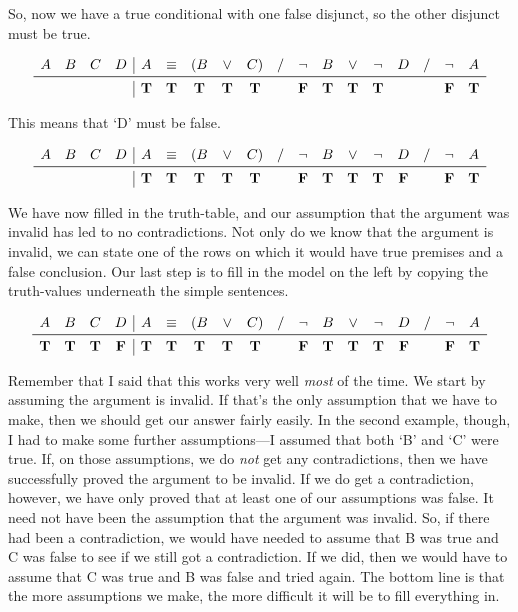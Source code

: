 \documentclass[../logic-text.tex]{subfiles}
\begin{document}
So, now we have a true conditional with one false disjunct, so the other disjunct must be true.


\[
\begin{array}{cccc|cccccccccccccc}
  A&B&C&D& A &  \liff & (B & \lor & C) & / & \lneg & B & \lor & \lneg & D & / & \lneg & A \\ \midrule
  &&&& \true & \true & \true & \true & \true && \false & \true & \true & \true &&& \false & \true \\
  \end{array}
\]

This means that \enquote*{D} must be false.

\[
\begin{array}{cccc|cccccccccccccc}
  A&B&C&D& A &  \liff & (B & \lor & C) & / & \lneg & B & \lor & \lneg & D & / & \lneg & A \\ \midrule
  &&&& \true & \true & \true & \true & \true && \false & \true & \true & \true & \false && \false & \true \\
  \end{array}
\]

We have now filled in the truth-table, and our assumption that the argument was invalid has led to no contradictions. Not only do we know that the argument is invalid, we can state one of the rows on which it would have true premises and a false conclusion. Our last step is to fill in the model on the left by copying the truth-values underneath the simple sentences.


\[
\begin{array}{cccc|cccccccccccccc}
  A&B&C&D& A &  \liff & (B & \lor & C) & / & \lneg & B & \lor & \lneg & D & / & \lneg & A \\ \midrule
  \true & \true & \true & \false & \true & \true & \true & \true & \true && \false & \true & \true & \true & \false && \false & \true \\
  \end{array}
\]

Remember that I said that this works very well \emph{most} of the time. We start by assuming the argument is invalid. If that's the only assumption that we have to make, then we should get our answer fairly easily. In the second example, though, I had to make some further assumptions---I assumed that both \enquote*{B}  and \enquote*{C} were true. If, on those assumptions, we do \emph{not} get any contradictions, then we have successfully proved the argument to be invalid. If we do get a contradiction, however, we have only proved that at least one of our assumptions was false. It need not have been the assumption that the argument was invalid. So, if there had been a contradiction, we would have needed to assume that B was true and C was false to see if we still got a contradiction. If we did, then we would have to assume that C was true and B was false and tried again. The bottom line is that the more assumptions we make, the more difficult it will be to fill everything in. 
\end{document}
